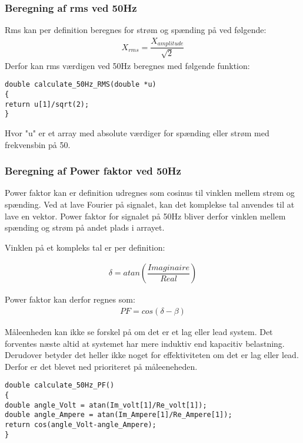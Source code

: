 \subsubsection{Beregning af rms ved 50Hz}
Rms kan per definition beregnes for strøm og spænding på ved følgende: 
\begin{align}
 X_{rms}= \dfrac{X_{amplitude}}{\sqrt{2}}
\end{align}
Derfor kan rms værdigen ved 50Hz beregnes med følgende funktion:
\begin{lstlisting}
double calculate_50Hz_RMS(double *u)
{
return u[1]/sqrt(2);  
}
\end{lstlisting}

Hvor "u" er et array med absolute værdiger for spænding eller strøm med frekvensbin på 50.

\subsubsection{Beregning af Power faktor ved 50Hz}

Power faktor kan er definition udregnes som cosinus til vinklen mellem strøm og spænding. Ved at lave Fourier på signalet, kan det komplekse tal anvendes til at lave en vektor. Power faktor for signalet på 50Hz bliver derfor vinklen mellem spænding og strøm på andet plads i arrayet.

Vinklen på et kompleks tal er per definition:

\begin{align}
\delta = atan(\dfrac{Imaginaire}{Real})
\end{align}

Power faktor kan derfor regnes som:
\begin{align}
PF = cos(\delta - \beta)
\end{align}

Måleenheden kan ikke se forskel på om det er et lag eller lead system. Det forventes næste altid at systemet har mere induktiv end kapacitiv belastning. Derudover betyder det heller ikke noget for effektiviteten om det er lag eller lead. Derfor er det blevet ned prioriteret på måleeneheden.

\begin{lstlisting}
double calculate_50Hz_PF()
{
double angle_Volt = atan(Im_volt[1]/Re_volt[1]);
double angle_Ampere = atan(Im_Ampere[1]/Re_Ampere[1]);    
return cos(angle_Volt-angle_Ampere);
}
\end{lstlisting}
 
    

  
